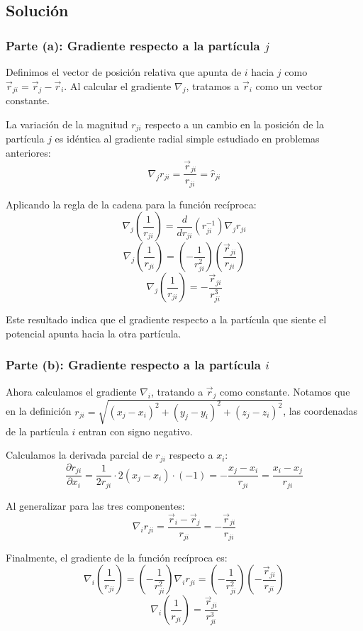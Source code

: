 \documentclass[12pt, letterpaper]{article}
\begin{document}
\subsection{Solución}

\subsubsection*{Parte (a): Gradiente respecto a la partícula $j$}

Definimos el vector de posición relativa que apunta de $i$ hacia $j$ como $\vec{r}_{ji} = \vec{r}_j - \vec{r}_i$. Al calcular el gradiente $\nabla_j$, tratamos a $\vec{r}_i$ como un vector constante.

La variación de la magnitud $r_{ji}$ respecto a un cambio en la posición de la partícula $j$ es idéntica al gradiente radial simple estudiado en problemas anteriores:
$$ \nabla_j r_{ji} = \frac{\vec{r}_{ji}}{r_{ji}} = \hat{r}_{ji} $$

Aplicando la regla de la cadena para la función recíproca:
$$ \nabla_j \left( \frac{1}{r_{ji}} \right) = \frac{d}{dr_{ji}} \left( r_{ji}^{-1} \right) \nabla_j r_{ji} $$
$$ \nabla_j \left( \frac{1}{r_{ji}} \right) = \left( -\frac{1}{r_{ji}^2} \right) \left( \frac{\vec{r}_{ji}}{r_{ji}} \right) $$
$$ \nabla_j \left( \frac{1}{r_{ji}} \right) = -\frac{\vec{r}_{ji}}{r_{ji}^3} $$

Este resultado indica que el gradiente respecto a la partícula que siente el potencial apunta hacia la otra partícula.

\subsubsection*{Parte (b): Gradiente respecto a la partícula $i$}

Ahora calculamos el gradiente $\nabla_i$, tratando a $\vec{r}_j$ como constante. Notamos que en la definición $r_{ji} = \sqrt{(x_j-x_i)^2 + (y_j-y_i)^2 + (z_j-z_i)^2}$, las coordenadas de la partícula $i$ entran con signo negativo.

Calculamos la derivada parcial de $r_{ji}$ respecto a $x_i$:
$$ \frac{\partial r_{ji}}{\partial x_i} = \frac{1}{2 r_{ji}} \cdot 2(x_j - x_i) \cdot (-1) = -\frac{x_j - x_i}{r_{ji}} = \frac{x_i - x_j}{r_{ji}} $$

Al generalizar para las tres componentes:
$$ \nabla_i r_{ji} = \frac{\vec{r}_i - \vec{r}_j}{r_{ji}} = -\frac{\vec{r}_{ji}}{r_{ji}} $$

Finalmente, el gradiente de la función recíproca es:
$$ \nabla_i \left( \frac{1}{r_{ji}} \right) = \left( -\frac{1}{r_{ji}^2} \right) \nabla_i r_{ji} = \left( -\frac{1}{r_{ji}^2} \right) \left( -\frac{\vec{r}_{ji}}{r_{ji}} \right) $$
$$ \nabla_i \left( \frac{1}{r_{ji}} \right) = \frac{\vec{r}_{ji}}{r_{ji}^3} $$
\end{document}
